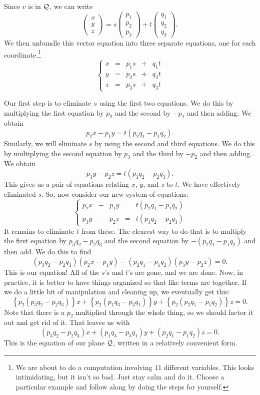 \documentclass[00-livre-main.tex]{subfiles}
\begin{document}
Since $v$ is in $\mathcal{Q}$, we can write
\[
\begin{pmatrix} x \\ y \\ z \end{pmatrix} = s \begin{pmatrix} p_1 \\ p_2 \\ p_3 \end{pmatrix} + t \begin{pmatrix} q_1 \\ q_2 \\ q_3 \end{pmatrix}.
\]
We then unbundle this vector equation into three separate equations, one for each coordinate.\footnote{We are about to do a computation involving $11$ different variables. This looks intimidating, but it isn't so bad. Just stay calm and do it. Choose a particular example and follow along by doing the steps for yourself.}
\[
\left\{ \begin{array}{rrrrr}
x & = & p_1 s & + & q_1 t \\
y & = & p_2 s & + & q_2 t \\
z & = & p_3 s & + & q_3 t 
\end{array}\right.
\]

Our first step is to eliminate $s$ using the first two equations. We do this by multiplying the first equation by $p_2$ and the second by $-p_1$ and then adding.
We obtain
\[
p_2 x - p_1 y = t (p_2q_1 - p_1 q_2).
\]
Similarly, we will eliminate $s$ by using the second and third equations. We do this by multiplying the second equation by $p_3$ and the third by $-p_2$ and then adding. We obtain
\[
p_3 y - p_2 z = t (p_3 q_2 - p_2 q_3).
\]
This gives us a pair of equations relating $x$, $y$, and $z$ to $t$. We have effectively eliminated $s$. So, now consider our new system of equations:
\[
\left\{ \begin{array}{rrrrr}
p_2 x &-& p_1 y &=& t (p_2q_1 - p_1 q_2) \\
p_3 y &-& p_2 z &=& t (p_3 q_2 - p_2 q_3)
\end{array}\right.
\]
It remains to eliminate $t$ from these. The clearest way to do that is to multiply the first equation by $p_3q_2-p_2q_3$ and the second equation by $-(p_2q_1 - p_1 q_2)$ and then add. We do this to find
\[
(p_3 q_2 - p_2 q_3)(p_2 x - p_1 y) -(p_2q_1 - p_1 q_2)(p_3 y - p_2 z) = 0.
\]
This is our equation! All of the $s$'s and $t$'s are gone, and we are done.
Now, in practice, it is better to have things organized so that like terms are together. If we do a little bit of manipulation and cleaning up, we eventually get this:
\[
\left\{p_2(p_3 q_2 - p_2 q_3)\right\} x +
\left\{p_2(p_1 q_3 - p_3 q_1)\right\} y +
\left\{p_2(p_2 q_1 - p_1 q_2)\right\} z = 0.
\]
Note that there is a $p_2$ multiplied through the whole thing, so we should factor it out and get rid of it. That leaves us with
\[
(p_3 q_2 - p_2 q_3) x +
(p_1 q_3 - p_3 q_1) y +
(p_2 q_1 - p_1 q_2) z = 0.
\]
This is the equation of our plane $\mathcal{Q}$, written in a relatively convenient form.
\end{document}

